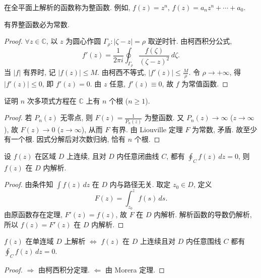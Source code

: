 \documentclass[theorem=false,mathfont=none,openany,sub3section]{easybook}
\begin{document}
\begin{definition}
  在全平面上解析的函数称为整函数. 例如, $f(z)=z^{n}$, $f(z)=a_{n}z^{n}+\cdots+a_{0}$.
\end{definition}

\begin{theorem}[Liouville 定理]
  有界整函数必为常数.
\end{theorem}

\begin{proof}
  $\forall z\in\mathbb{C}$, 以 $z$ 为圆心作圆 $\Gamma_{\rho}:|\zeta-z|=\rho$ 取逆时针.
  由柯西积分公式,
  \[
  f'(z)=\frac{1}{2\pi i}\oint_{\Gamma_{\rho}}\frac{f(\zeta)}{(\zeta-z)^{2}}\,d\zeta.
  \]
  当 $|f|$ 有界时, 记 $|f(z)|\leq M$. 由柯西不等式, $|f'(z)|\leq\frac{M}{\rho}$.
  令 $\rho\to+\infty$, 得 $|f'(z)|\leq0$, 即 $f'(z)=0$. 由 $z$ 任意, $f'(z)\equiv0$, 故 $f$ 为常值函数.
\end{proof}

\begin{example}
  证明 $n$ 次多项式方程在 $\mathbb{C}$ 上有 $n$ 个根 ($n\geq1$).
\end{example}

\begin{proof}
  若 $P_{n}(z)$ 无零点, 则 $F(z)=\frac{1}{P_{n}(z)}$ 为整函数. 又 $P_{n}(z)\to\infty$ ($z\to\infty$), 故 $F(z)\to0$ ($z\to\infty$), 从而 $F$ 有界. 由 Liouville 定理 $F$ 为常数, 矛盾. 故至少有一个根. 因式分解后对次数归纳, 恰有 $n$ 个根.
\end{proof}

\begin{theorem}[Morera 定理]
  设 $f(z)$ 在区域 $D$ 上连续, 且对 $D$ 内任意闭曲线 $C$, 都有 $\oint_{C}f(z)\,dz=0$, 则 $f(z)$ 在 $D$ 内解析.
\end{theorem}

\begin{proof}
  由条件知 $\int f(z)\,dz$ 在 $D$ 内与路径无关. 取定 $z_{0}\in D$, 定义
  \[
  F(z)=\int_{z_{0}}^{z}f(s)\,ds.
  \]
  由原函数存在定理, $F'(z)=f(z)$, 故 $F$ 在 $D$ 内解析. 解析函数的导数仍解析, 所以 $f(z)=F'(z)$ 在 $D$ 内解析.
\end{proof}

\begin{theorem}
  $f(z)$ 在单连域 $D$ 上解析 $\Leftrightarrow$ $f(z)$ 在 $D$ 上连续且对 $D$ 内任意围线 $C$ 都有 $\oint_{C}f(z)\,dz=0$.
\end{theorem}

\begin{proof}
  $\Rightarrow$ 由柯西积分定理. $\Leftarrow$ 由 Morera 定理.
\end{proof}
\end{document}
